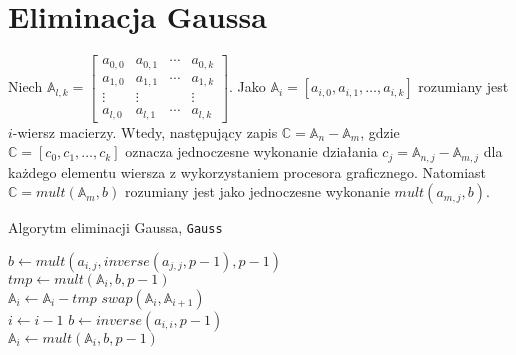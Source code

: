\documentclass[]{article}
\begin{document}
	\section{Eliminacja Gaussa}
		Niech 
		\newline
		\(\mathbb{A}_{l,k} = 
		\begin{bmatrix}
			a_{0,0} & a_{0,1} & \cdots & a_{0,k} \\
			a_{1,0} & a_{1,1} & \cdots & a_{1,k} \\
			\vdots & \vdots & & \vdots \\
			a_{l,0} & a_{l,1} & \cdots & a_{l,k} 
		\end{bmatrix} \). 
		\newline
		Jako \(\mathbb{A}_i = [a_{i,0}, a_{i,1}, \dots, a_{i,k}]\) rozumiany jest \(i\)-wiersz macierzy. Wtedy, następujący zapis \(\mathbb{C} = \mathbb{A}_n - \mathbb{A}_m\), gdzie \(\mathbb{C} = [c_0, c_1, \dots, c_k]\) oznacza jednoczesne wykonanie działania \(c_j = \mathbb{A}_{n,j} - \mathbb{A}_{m,j}\) dla każdego elementu wiersza z wykorzystaniem procesora graficznego. Natomiast \(\mathbb{C} = mult(\mathbb{A}_m, b)\) rozumiany jest jako jednoczesne wykonanie \(mult(a_{m,j}, b)\). 
		
		\begin{algorithm}[H]
			\SetAlgoLined
			\label{Gauss}
			\caption{Algorytm eliminacji Gaussa, \texttt{Gauss}}
			{
				{
					{
						{
							\(b \gets mult(a_{i,j}, inverse(a_{j,j}, p-1), p-1)\) \\
							\(tmp \gets mult(\mathbb{A}_i, b, p-1)\) \\
							\(\mathbb{A}_i \gets \mathbb{A}_i - tmp\)
						}
						\Else
						{
							\(swap(\mathbb{A}_i, \mathbb{A}_{i+1})\) \\
							\(i \gets i - 1\)
						}
					}
				}
			}
			{
				{
					\(b \gets inverse(a_{i,i}, p-1)\) \\
					\(\mathbb{A}_i \gets mult(\mathbb{A}_i, b, p-1)\) \\
				}
				\Else
				{
				}
			}
		\end{algorithm}
			
	
	
\end{document}

